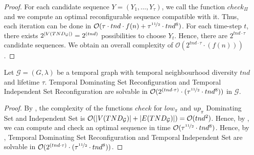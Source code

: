\begin{proof}
  
  For each candidate sequence $Y = (Y_1,\dots,Y_\tau)$, we call the function $check_\Pi$ and we compute an optimal reconfigurable sequence compatible with it. Thus, each iteration can be done in $\mathcal{O}(\tau\cdot tnd \cdot f(n) + \tau^{\nicefrac{11}{2}} \cdot tnd^8)$. For each time-step $t$, there exists $2^{|V(TND_{\mathcal{G}}|)} = 2^{(tnd)}$ possibilities to choose $Y_t$. Hence, there are $2^{tnd\cdot \tau}$ candidate sequences. We obtain an overall complexity of $\mathcal{O}(2^{tnd\cdot\tau} \cdot (f(n)))$.
\end{proof}

\begin{corollaryrep}
  Let $\mathcal{G}=(G,\lambda)$ be a temporal graph with temporal neighbourhood diversity $tnd$ and lifetime $\tau$.
  {\sc Temporal Dominating Set Reconfiguration} and {\sc Temporal Independent Set Reconfiguration} are solvable in $\mathcal{O}(2^{(tnd\cdot\tau)}\cdot(\tau^{\nicefrac{11}{2}} \cdot tnd^8))$ in $\mathcal{G}$.
  
\end{corollaryrep}

\begin{proof}
By , the complexity of the functions $check$ for $low_\pi$ and $up_\pi$ {\sc Dominating Set} and {\sc Independent Set} is $\mathcal{O}(|V(TND_{\mathcal{G}})|+|E(TND_{\mathcal{G}})|) = \mathcal{O}(tnd^2)$. Hence, by , we can compute and check an optimal sequence in time $\mathcal{O}(\tau^{\nicefrac{11}{2}} \cdot tnd^8)$. Hence, by , {\sc Temporal Dominating Set Reconfiguration} and {\sc Temporal Independent Set} are solvable in $\mathcal{O}(2^{(tnd\cdot\tau)}\cdot(\tau^{\nicefrac{11}{2}} \cdot tnd^8))$.
\end{proof}